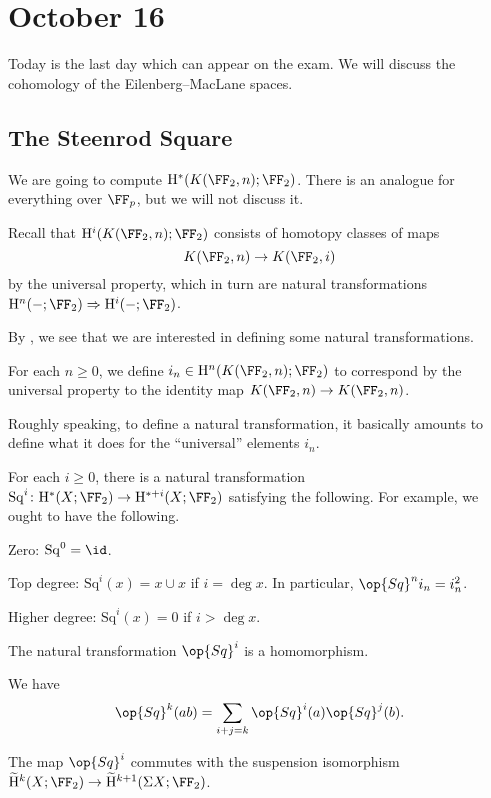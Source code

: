 \documentclass[../notes.tex]{subfiles}
\begin{document}
\section{October 16}
Today is the last day which can appear on the exam. We will discuss the cohomology of the Eilenberg--MacLane spaces.

\subsection{The Steenrod Square}
We are going to compute $\mathrm H^*(K(\FF_2,n);\FF_2)$. There is an analogue for everything over $\FF_p$, but we will not discuss it.
\begin{remark} \label{rem:cohom-em-by-nat-trans}
	Recall that $\mathrm H^i(K(\FF_2,n);\FF_2)$ consists of homotopy classes of maps
	\[K(\FF_2,n)\to K(\FF_2,i)\]
	by the universal property, which in turn are natural transformations $\mathrm H^n(-;\FF_2)\Rightarrow\mathrm H^i(-;\FF_2)$.
\end{remark}
By , we see that we are interested in defining some natural transformations.
\begin{notation}
	For each $n\ge0$, we define $i_n\in\mathrm H^n(K(\FF_2,n);\FF_2)$ to correspond by the universal property to the identity map $K(\FF_2,n)\to K(\FF_2,n)$.
\end{notation}
\begin{remark}
	Roughly speaking, to define a natural transformation, it basically amounts to define what it does for the ``universal'' elements $i_n$.
\end{remark}
\begin{proposition}
	For each $i\ge0$, there is a natural transformation $\mathrm{Sq}^i\colon\mathrm H^*(X;\FF_2)\to\mathrm H^{*+i}(X;\FF_2)$ satisfying the following. For example, we ought to have the following.
	\begin{listalph}
		\item Zero: $\mathrm{Sq}^0=\id$.
		\item Top degree: $\mathrm{Sq}^i(x)=x\cup x$ if $i=\deg x$. In particular, $\op{Sq}^ni_n=i_n^2$.
		\item Higher degree: $\mathrm{Sq}^i(x)=0$ if $i>\deg x$.
		\item The natural transformation $\op{Sq}^i$ is a homomorphism.
		\item We have
		\[\op{Sq}^k(ab)=\sum_{i+j=k}\op{Sq}^i(a)\op{Sq}^j(b).\]
		\item The map $\op{Sq}^i$ commutes with the suspension isomorphism $\widetilde{\mathrm H}^k(X;\FF_2)\to\widetilde{\mathrm H}^{k+1}(\Sigma X;\FF_2)$.
	\end{listalph}
\end{proposition}
\end{document}
